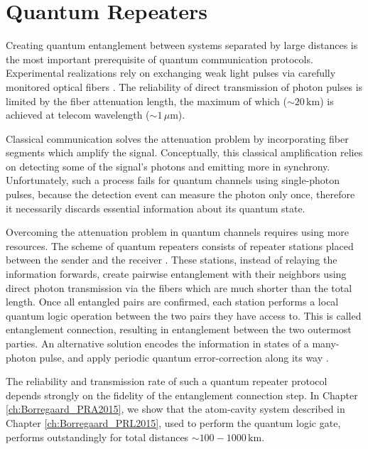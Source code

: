 \section{Quantum Repeaters}
Creating quantum entanglement between systems separated by
large distances is the most important prerequisite of quantum communication
protocols. Experimental realizations rely on exchanging weak light pulses
via carefully monitored optical fibers \cite{Peev2009}. The
reliability of direct transmission of photon pulses is limited by the
fiber attenuation length, the maximum of which ($\sim 20\,\mathrm{km}$) is
achieved at telecom wavelength ($\sim 1\,\mu\mathrm{m}$).

Classical communication solves the attenuation problem by incorporating fiber
segments which amplify the signal. Conceptually, this classical amplification
relies on detecting some of the signal's photons and emitting more in synchrony.
Unfortunately, such a process fails for quantum channels using single-photon
pulses, because the detection event can measure the photon only once,
therefore it necessarily discards essential information about its quantum state.

Overcoming the attenuation problem in quantum channels requires using more
resources. The scheme of quantum repeaters consists of repeater stations placed
between the sender and the receiver \cite{bennett2, bennett, duan3}.
These stations, instead of relaying the information forwards, create pairwise
entanglement with their neighbors using direct photon transmission via the
fibers which are much shorter than the total length. Once all entangled pairs
are confirmed, each station performs a local quantum logic operation between the two
pairs they have access to. This is called entanglement connection, resulting in
entanglement between the two outermost parties. An alternative solution 
encodes the information in states of a many-photon pulse, and apply periodic
quantum error-correction along its way \cite{Muralidharan2015}.

The reliability and transmission rate of such a quantum repeater protocol
depends strongly on the fidelity of the entanglement connection step. In Chapter
\ref{ch:Borregaard_PRA2015}, we show that the atom-cavity system described in
Chapter \ref{ch:Borregaard_PRL2015}, used to perform the quantum logic gate,
performs outstandingly for total distances $\sim
100-1000\,\mathrm{km}$.



